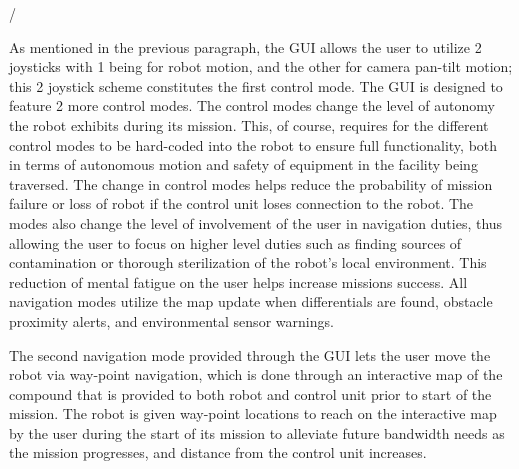 /%

As mentioned in the previous paragraph, the GUI allows the user to utilize 2 joysticks with 1 being for robot motion, and the other for camera pan-tilt motion; this 2 joystick scheme constitutes the first control mode. The GUI is designed to feature 2 more control modes. The control modes change the level of autonomy the robot exhibits during its mission. This, of course, requires for the different control modes to be hard-coded into the robot to ensure full functionality, both in terms of autonomous motion and safety of equipment in the facility being traversed. The change in control modes helps reduce the probability of mission failure or loss of robot if the control unit loses connection to the robot. The modes also change the level of involvement of the user in navigation duties, thus allowing the user to focus on higher level duties such as finding sources of contamination or thorough sterilization of the robot's local environment. This reduction of mental fatigue on the user helps increase missions success. All navigation modes utilize the map update when differentials are found, obstacle proximity alerts, and environmental sensor warnings. 

The second navigation mode provided through the GUI lets the user move the robot via way-point navigation, which is done through an interactive map of the compound that is provided to both robot and control unit prior to start of the mission. The robot is given way-point locations to reach on the interactive map by the user during the start of its mission to alleviate future bandwidth needs as the mission progresses, and distance from the control unit increases. 

